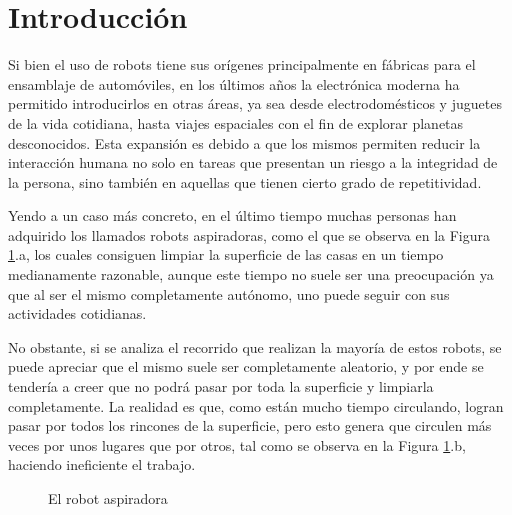 \section{Introducción}
\label{sec:2_marcoteorico}
Si bien el uso de robots tiene sus orígenes principalmente en fábricas para el ensamblaje de automóviles, en los últimos años la electrónica moderna ha permitido introducirlos en otras áreas, ya sea desde electrodomésticos y juguetes de la vida cotidiana, hasta viajes espaciales con el fin de explorar planetas desconocidos. Esta expansión es debido a que los mismos permiten reducir la interacción humana no solo en tareas que presentan un riesgo a la integridad de la persona, sino también en aquellas que tienen cierto grado de repetitividad.

Yendo a un caso más concreto, en el último tiempo muchas personas han adquirido los llamados robots aspiradoras, como el que se observa en la Figura \ref{fig:vaccumrobot}.a, los cuales consiguen limpiar la superficie de las casas en un tiempo medianamente razonable, aunque este tiempo no suele ser una preocupación ya que al ser el mismo completamente autónomo, uno puede seguir con sus actividades cotidianas. 

No obstante, si se analiza el recorrido que realizan la mayoría de estos robots, se puede apreciar que el mismo suele ser completamente aleatorio, y por ende se tendería a creer que no podrá pasar por toda la superficie y limpiarla completamente. La realidad es que, como están mucho tiempo circulando, logran pasar por todos los rincones de la superficie, pero esto genera que circulen más veces por unos lugares que por otros, tal como se observa en la Figura \ref{fig:vaccumrobot}.b, haciendo ineficiente el trabajo.

\begin{figure}[!ht]
    \centering
    \qquad
    \caption{El robot aspiradora}
    \label{fig:vaccumrobot}
\end{figure}

